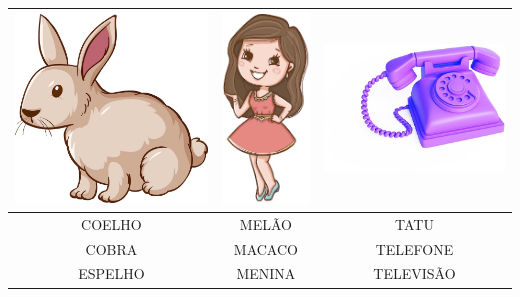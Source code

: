 \begin{center}
\begin{tabular}{ccc}
\multicolumn{1}{l}{\includegraphics[width=.3\textwidth]{media/image70.png}} & \multicolumn{1}{l}{\includegraphics[width=.3\textwidth]{media/image72.png} } & \multicolumn{1}{l}{\includegraphics[width=.3\textwidth]{media/image73.png}} \\ \hline
\multicolumn{1}{|c|}{COELHO} & \multicolumn{1}{c|}{MELÃO} & \multicolumn{1}{c|}{TATU} \\ \hline
\multicolumn{1}{|c|}{COBRA} & \multicolumn{1}{c|}{MACACO} & \multicolumn{1}{c|}{TELEFONE} \\ \hline
\multicolumn{1}{|c|}{ESPELHO} & \multicolumn{1}{c|}{MENINA} & \multicolumn{1}{c|}{TELEVISÃO} \\ \hline
\end{tabular}
\end{center}


